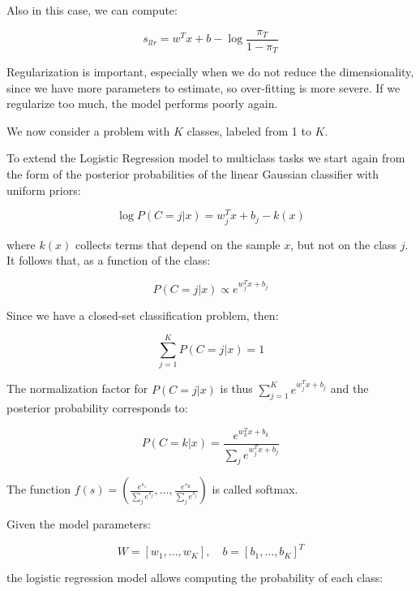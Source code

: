 Also in this case, we can compute:


\begin{equation*}
s_{llr} = w^T x + b - \log \frac{\pi_T}{1-\pi_T}
\end{equation*}

Regularization is important, especially when we do not reduce the dimensionality, since we have more parameters to estimate, so over-fitting is more severe. If we regularize too much, the model performs poorly again.

We now consider a problem with $K$ classes, labeled from 1 to $K$.

To extend the Logistic Regression model to multiclass tasks we start again from the form of the posterior probabilities of the linear Gaussian classifier with uniform priors:


\begin{equation*}
\log P(C = j | x) = w_j^T x + b_j - k(x)
\end{equation*}

where $k(x)$ collects terms that depend on the sample $x$, but not on the class $j$. It follows that, as a function of the class:


\begin{equation*}
P(C = j | x) \propto e^{w_j^T x + b_j}
\end{equation*}

Since we have a closed-set classification problem, then:


\begin{equation*}
\sum_{j=1}^K P(C = j | x) = 1
\end{equation*}

The normalization factor for $P(C = j | x)$ is thus $\sum_{j=1}^{K} e^{w_j^T x + b_j}$ and the posterior probability corresponds to:


\begin{equation*}
P(C = k | x) = \frac{e^{w_k^T x + b_k}}{\sum_j e^{w_j^T x + b_j}}
\end{equation*}

The function $f(s) = \left(\frac{e^{s_1}}{\sum_j e^{s_j}}, \ldots, \frac{e^{s_K}}{\sum_j e^{s_j}}\right)$ is called softmax.

Given the model parameters:


\begin{equation*}
W = [w_1, ..., w_K], \quad b = [b_1, ..., b_K]^T
\end{equation*}

the logistic regression model allows computing the probability of each class:


